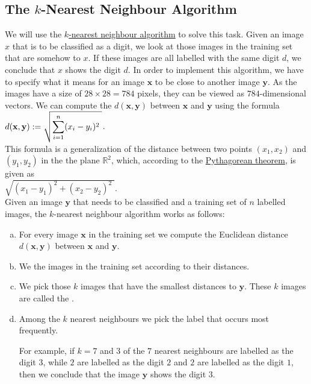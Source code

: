 \subsection{The $k$-Nearest Neighbour Algorithm}
We will use the \href{https://en.wikipedia.org/wiki/K-nearest_neighbors_algorithm}{$k$-nearest neighbour algorithm} 
to solve this task.  Given an image $x$ that is to be classified as a digit, we look at those images in the
training set that are somehow  to $x$.  If these images are all labelled with the same digit $d$,
we conclude that $x$ shows the digit $d$.  In order to implement this algorithm, we have to specify what it
means for an image $\mathbf{x}$ to be close to another image $\mathbf{y}$.  As the images have a size of $28 \times 28 = 784$
pixels, they can be viewed as $784$-dimensional vectors.  We can compute the 
$d(\mathbf{x}, \mathbf{y})$ between $\mathbf{x}$ and $\mathbf{y}$ using the formula
\\[0.2cm]
\hspace*{1.3cm}
$\displaystyle d(\mathbf{x}, \mathbf{y}) := \sqrt{\sum\limits_{i=1}^n (x_i - y_i)^2\;}$.
\\[0.2cm]
This formula is a generalization of the distance between two points $(x_1, x_2)$ and $(y_1, y_2)$ in the the
plane $\mathbb{R}^2$, which, according to the \href{https://en.wikipedia.org/wiki/Pythagorean_theorem}{Pythagorean theorem}, is given as 
\\[0.2cm]
\hspace*{1.3cm}
$\sqrt{(x_1 - y_1)^2 + (x_2 - y_2)^2\;}$.
\\[0.2cm]
Given an image $\mathbf{y}$ that needs to be classified and a training set of $n$ labelled images, the $k$-nearest
neighbour algorithm works as follows: 
\begin{enumerate}[(a)]
\item For every image $\mathbf{x}$ in the training set we compute the Euclidean distance $d(\mathbf{x},
  \mathbf{y})$ between $\mathbf{x}$ and $\mathbf{y}$.
\item We  the images in the training set according to their distances.
\item We pick those $k$ images that have the smallest distances to $\mathbf{y}$.
      These $k$ images are called the .
\item Among the $k$ nearest neighbours we pick the label that occurs most frequently.
      
      For example, if $k=7$ and $3$ of the $7$ nearest neighbours are labelled as the digit $3$, while $2$ are
      labelled as the digit $2$ and $2$ are labelled as the digit $1$, then we conclude that the image
      $\mathbf{y}$ shows the digit $3$. 
\end{enumerate}

